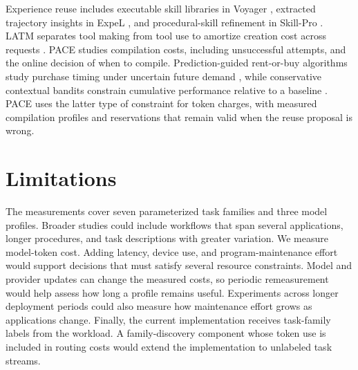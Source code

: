 Experience reuse includes executable skill libraries in Voyager \citep{wang2023voyager}, extracted trajectory insights in ExpeL \citep{zhao2023expel}, and procedural-skill refinement in Skill-Pro \citep{mi2026skillpro}.
LATM separates tool making from tool use to amortize creation cost across requests \citep{cai2023toolmakers}.
PACE studies compilation costs, including unsuccessful attempts, and the online decision of when to compile.
Prediction-guided rent-or-buy algorithms study purchase timing under uncertain future demand \citep{purohit2018improving,gollapudi2019online}, while conservative contextual bandits constrain cumulative performance relative to a baseline \citep{kazerouni2016conservative}.
PACE uses the latter type of constraint for token charges, with measured compilation profiles and reservations that remain valid when the reuse proposal is wrong.

\section{Limitations}
\label{sec:limitations}

The measurements cover seven parameterized task families and three model profiles.
Broader studies could include workflows that span several applications, longer procedures, and task descriptions with greater variation.
We measure model-token cost.
Adding latency, device use, and program-maintenance effort would support decisions that must satisfy several resource constraints.
Model and provider updates can change the measured costs, so periodic remeasurement would help assess how long a profile remains useful.
Experiments across longer deployment periods could also measure how maintenance effort grows as applications change.
Finally, the current implementation receives task-family labels from the workload.
A family-discovery component whose token use is included in routing costs would extend the implementation to unlabeled task streams.


\FloatBarrier
\label{main:text-end}
\clearpage

\clearpage



\clearpage
\appendix
\raggedbottom
{}

